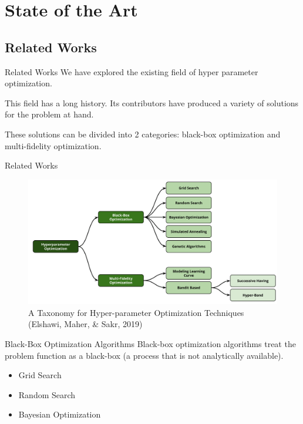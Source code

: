 \documentclass[10pt]{beamer}
\begin{document}
  \section{State of the Art}
  \subsection{Related Works}
  \begin{frame}{Related Works}
    We have explored the existing field of hyper parameter optimization. 

    This field has a long history. Its contributors have produced a variety of solutions for the problem at hand. 

    These solutions can be divided into 2 categories: black-box optimization and multi-fidelity optimization.
  \end{frame}
  \begin{frame}{Related Works}
    \begin{figure}
          \centering
          \includegraphics[width=\textwidth]{images/state_art-taxonomy_optimizers.png}
          \caption*{A Taxonomy for Hyper-parameter Optimization Techniques (Elshawi, Maher, \& Sakr, 2019)}
        \end{figure}
  \end{frame}
  \begin{frame}{Black-Box Optimization Algorithms}
    Black-box optimization algorithms treat the problem function as a black-box (a process that is not analytically available).
    \begin{itemize}
      \item{Grid Search}
      \item{Random Search}
      \item{Bayesian Optimization}
    \end{itemize}
  \end{frame}
\end{document}
